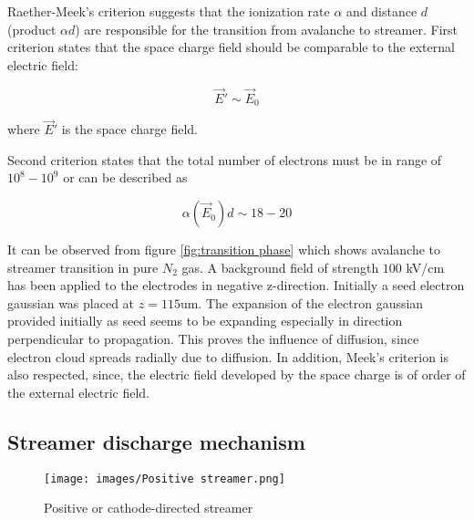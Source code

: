 \documentclass[paper=a4, fontsize=13pt]{scrartcl}
\begin{document}
Raether-Meek's criterion suggests that the ionization rate $\alpha$ and distance $d$ (product $\alpha d$) are responsible for the transition from avalanche to streamer. First criterion states that the space charge field should be comparable to the external electric field:

\begin{equation}
\vec{E}' \sim  \vec{E}_0
\end{equation}

where $\vec{E}'$ is the space charge field.

Second criterion states that the total number of electrons must be in range of $10^8 - 10^9$ or can be described as

\begin{equation}
\alpha (\vec{E}_0) d \sim 18-20
\end{equation}



It can be observed from figure \ref{fig:transition phase} which shows avalanche to streamer transition in pure $N_2$ gas. A background field of strength $100$ kV/cm has been applied to the electrodes in negative z-direction. Initially a seed electron gaussian was placed at $z= 115$um. The expansion of the electron gaussian provided initially as seed seems to be expanding especially in direction perpendicular to propagation. This proves the influence of diffusion, since electron cloud spreads radially due to diffusion. In addition, Meek's criterion is also respected, since, the electric field developed by the space charge is of order of the external electric field. 

\subsection{Streamer discharge mechanism}

\begin{figure}
\centering
\texttt{[image: images/Positive streamer.png]}
 \caption{Positive or cathode-directed streamer \cite{Raizer1991GasRazryada} }
  \label{fig:positive streamer}
\end{figure}
\end{document}
